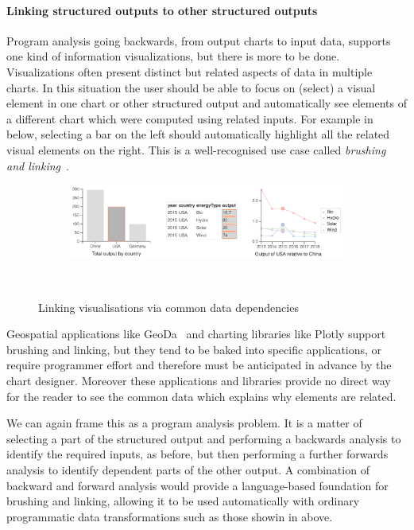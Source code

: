 \paragraph{Linking structured outputs to other structured outputs}
Program analysis going backwards, from output charts to input data, supports one kind of information visualizations, but there is more to be done. Visualizations often present distinct but related aspects of data in multiple charts. In this situation the user should be able to focus on (select) a visual element in one chart or other structured output and automatically see elements of a different chart which were computed using related inputs. For example in  below, selecting a bar on the left should automatically highlight all the related visual elements on the right. This is a well-recognised use case called \emph{brushing and linking}~\cite{becker87}.

\begin{figure}[H]
  \begin{subfigure}[b]{0.99\textwidth}
     \centering
     {\includegraphics[scale=0.58]{fig/example/vis-linking.png}}
  \end{subfigure}\\[2mm]
  \begin{subfigure}{0.8\textwidth}
     \small
     
  \end{subfigure}
 \caption{Linking visualisations via common data dependencies}
 \label{fig:introduction:vis-linking}
\end{figure}

Geospatial applications like GeoDa~\cite{anselin06} and charting libraries like Plotly support brushing and linking, but they tend to be baked into specific applications, or require programmer effort and therefore must be anticipated in advance by the chart designer. Moreover these applications and libraries provide no direct way for the reader to see the common data which explains why elements are related.

We can again frame this as a program analysis problem. It is a matter of selecting a part of the structured output and performing a backwards analysis to identify the required inputs, as before, but then performing a further forwards analysis to identify dependent parts of the other output. A combination of backward and forward analysis would provide a language-based foundation for brushing and linking, allowing it to be used automatically with ordinary programmatic data transformations such as those showin in  above.

